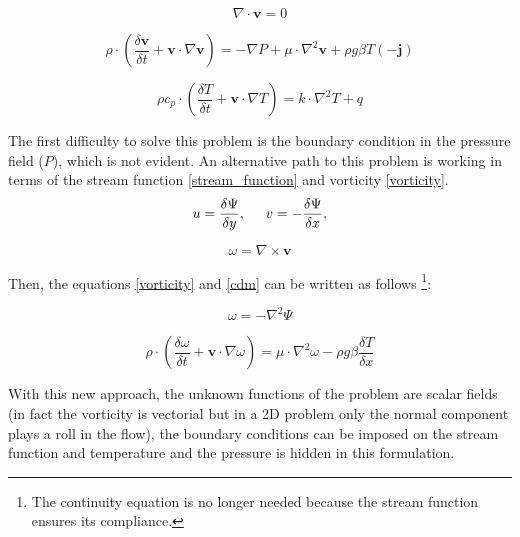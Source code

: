 \begin {equation} \label{cont}
\nabla \cdot \mathbf{v}= 0
\end{equation}

\begin {equation} \label{cdm}
\rho \cdot \left( \frac{\delta \mathbf {v}}{\delta t} + \mathbf{v} \cdot
\nabla \mathbf{v}\right)= -\nabla P + \mu \cdot \nabla^2 \mathbf{v} + \rho g
\beta T (-\mathbf{j})
\end{equation}

\begin {equation} \label{ener}
\rho c_p \cdot \left( \frac{\delta T}{\delta t} + \mathbf{v} \cdot
\nabla T\right)= k \cdot \nabla^2 T + q
\end{equation}

The first difficulty to solve this problem is the boundary condition in the
pressure field ($P$), which is not evident. An alternative path to this problem
is working in terms of the stream function \ref{stream_function} and
vorticity \ref{vorticity}. \\

\begin {equation} \label{stream_function}
u=\frac{\delta \Psi}{\delta y}, \hspace{0.5cm} v=-\frac{\delta \Psi}{\delta x},
\end{equation}

\begin{equation} \label{vorticity}
\omega= \nabla \times \mathbf{v}
\end{equation}

Then, the equations \ref{vorticity} and \ref{cdm} can be written as follows
\footnote{The continuity equation is no longer needed because the stream function ensures its compliance.}:

\begin {equation} \label{cont2}
\omega= - \nabla^2 \Psi
\end{equation}

\begin {equation} \label{cdm2}
\rho \cdot \left( \frac{\delta \omega}{\delta t} + \mathbf{v} \cdot
\nabla \omega\right)=  \mu \cdot \nabla^2 \omega - \rho g
\beta \frac{\delta T}{\delta x}
\end{equation}

With this new approach, the unknown functions of the problem are scalar
fields (in fact the vorticity is vectorial but in a 2D problem only the normal
component plays a roll in the flow), the boundary conditions can be imposed on
the stream function and temperature and the pressure is hidden in this
formulation. \\

